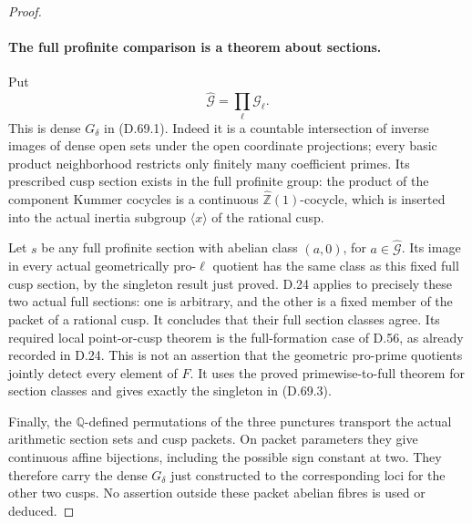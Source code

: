 \begin{proof}
\paragraph{The full profinite comparison is a theorem about sections.}
Put
\[
                   \widehat{\mathcal G}
                           =\prod_\ell\mathcal G_\ell.
                                                        \tag{D.69.10}
\]
This is dense \(G_\delta\) in (D.69.1).
Indeed it is a countable intersection of
inverse images of dense open sets under the
open coordinate projections; every basic
product neighborhood restricts only finitely
many coefficient primes. Its prescribed cusp
section exists in the full profinite group:
the product of the component Kummer cocycles
is a continuous \(\widehat{\mathbb Z}(1)\)-cocycle,
which is inserted into the actual inertia
subgroup \(\langle x\rangle\) of the rational cusp.

Let \(s\) be any full profinite section with
abelian class \((a,0)\), for
\(a\in\widehat{\mathcal G}\). Its image in
every actual geometrically pro-\(\ell\)
quotient has the same class as this fixed
full cusp section, by the singleton result
just proved. D.24 applies to precisely these
two actual full sections: one is arbitrary,
and the other is a fixed member of the
packet of a rational cusp. It concludes
that their full section classes agree.
Its required local point-or-cusp theorem is
the full-formation case of D.56, as already
recorded in D.24. This is not an assertion
that the geometric pro-prime quotients
jointly detect every element of \(F\).
It uses the proved primewise-to-full theorem
for section classes and gives exactly the
singleton in (D.69.3).

Finally, the \(\mathbb Q\)-defined permutations
of the three punctures transport the actual
arithmetic section sets and cusp packets.
On packet parameters they give continuous
affine bijections, including the possible
sign constant at two. They therefore carry
the dense \(G_\delta\) just constructed to
the corresponding loci for the other two
cusps. No assertion outside these packet
abelian fibres is used or deduced.
\end{proof}
